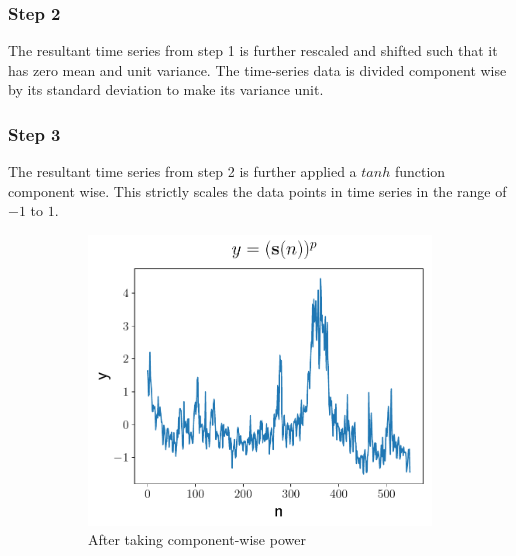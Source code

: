   
\subsubsection{Step 2}
   The resultant time series from step 1 is further rescaled and shifted such that it has zero mean and unit variance. The time-series data is divided component wise by its standard deviation to make its variance unit. 
   
\subsubsection{Step 3}
\indent
  The resultant time series from step 2 is further applied a $tanh$ function component wise. This strictly scales the data points in time series in the range of $-1$ to $1$.
  
  \begin{figure}[h]
      \begin{subfigure}[h]{0.5\textwidth}
          \includegraphics[width=\textwidth]{./description/images/squeezed}
          \caption{ After taking component-wise power}
          \label{fig:squeezed}
      \end{subfigure}
      \begin{subfigure}[h]{0.5\textwidth}

\end{subfigure}
\end{figure}
